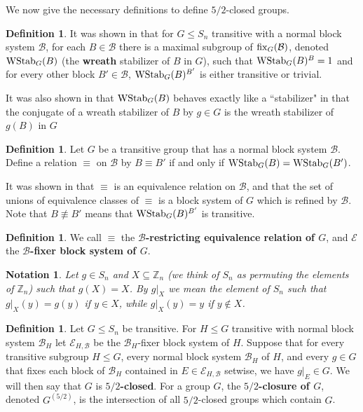 \documentclass{amsart}
\newtheorem{notation}[thrm]{Notation}
\theoremstyle{definition}
\newtheorem{definition}[thrm]{Definition}
\theoremstyle{remark}
\numberwithin{equation}{section}
\def\Z{{\mathbb Z}}
\def\fix{{\rm fix}}
\def\cal{\mathcal}
\def\WStab{{\rm WStab}}
\begin{document}
We now give the necessary definitions to define $5/2$-closed groups.

\begin{definition}
It was shown in \cite[Lemma 1.7]{Dobson2023apreprint} that for $G\le S_n$ transitive with a normal block system ${\cal B}$, for each $B\in{\cal B}$ there is a maximal subgroup of $\fix_G({\cal B})$, denoted $\WStab_G(B)$ (the {\bf wreath} stabilizer of $B$ in $G$), such that $\WStab_G(B)^B = 1$ and for every other block $B'\in{\cal B}$, $\WStab_G(B)^{B'}$ is either transitive or trivial.
\end{definition}

It was also shown in \cite[Lemma 1.9]{Dobson2023apreprint} that $\WStab_G(B)$ behaves exactly like a ``stabilizer" in that the conjugate of a wreath stabilizer of $B$ by $g\in G$ is the wreath stabilizer of $g(B)$ in $G$

\begin{definition}\label{automorphismtooldef}
Let $G$ be a transitive group that has a normal block system ${\cal B}$.  Define a relation $\equiv$ on ${\cal B}$ by $B\equiv B'$ if and only if $\WStab_G(B) = \WStab_G(B')$.
\end{definition}

It was shown in \cite[Lemma 1.11]{Dobson2023apreprint} that $\equiv$ is an equivalence relation on ${\cal B}$, and that the set of unions of equivalence classes of $\equiv$ is a block system of $G$ which is refined by ${\cal B}$.   Note that $B\not\equiv B'$ means that $\WStab_G(B)^{B'}$ is transitive.

\begin{definition}
We call $\equiv$ the {\bf ${\cal B}$-restricting equivalence relation of $G$}, and ${\cal E}$ the {\bf ${\cal B}$-fixer block system of $G$}.
\end{definition}

\begin{notation}
Let $g\in S_n$ and $X\subseteq\Z_n$ (we think of $S_n$ as permuting the elements of $\Z_n$) such that $g(X) = X$.  By $g\vert_X$ we mean the element of $S_n$ such that $g\vert_X(y) = g(y)$ if $y\in X$, while $g\vert_X(y) = y$ if $y\notin X$.
\end{notation}

\begin{definition}
Let $G\le S_n$ be transitive.  For $H\le G$  transitive with normal block system ${\cal B}_H$ let ${\cal E}_{H,{\cal B}}$ be the ${\cal B}_H$-fixer block system of $H$. Suppose that for every transitive subgroup $H\le G$, every normal block system ${\cal B}_H$ of $H$, and every $g\in G$ that fixes each block of ${\cal B}_H$ contained in $E\in{\cal E}_{H,{\cal B}}$ setwise, we have $g\vert_E\in G$.  We will then say that $G$ is {\bf $5/2$-closed}. For a group $G$, the {\bf $5/2$-closure of $G$}, denoted $G^{(5/2)}$, is the intersection of all $5/2$-closed groups which contain $G$.
\end{definition}
\end{document}

